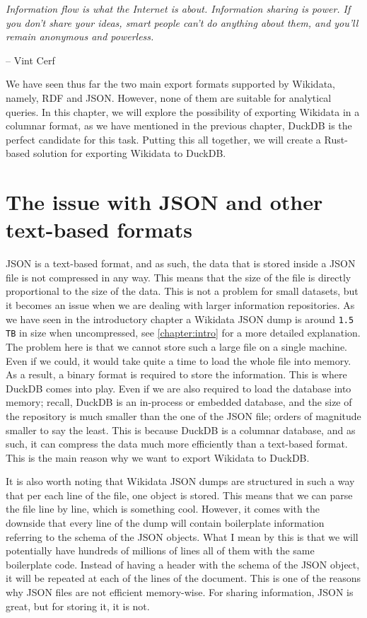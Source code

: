 \epigraph{\textit{Information flow is what the Internet is about. Information sharing is power. If you don't share your ideas, smart people can't do anything about them, and you'll remain anonymous and powerless.}}{-- \textup{Vint Cerf}}

We have seen thus far the two main export formats supported by Wikidata, namely, RDF and JSON. However, none of them are suitable for analytical queries. In this chapter, we will explore the possibility of exporting Wikidata in a columnar format, as we have mentioned in the previous chapter, DuckDB is the perfect candidate for this task. Putting this all together, we will create a Rust-based solution for exporting Wikidata to DuckDB.

\section{The issue with JSON and other text-based formats}
\label{section:issue}

JSON is a text-based format, and as such, the data that is stored inside a JSON file is not compressed in any way. This means that the size of the file is directly proportional to the size of the data. This is not a problem for small datasets, but it becomes an issue when we are dealing with larger information repositories. As we have seen in the introductory chapter a Wikidata JSON dump is around \texttt{1.5 TB} in size when uncompressed, see \ref{chapter:intro} for a more detailed explanation. The problem here is that we cannot store such a large file on a single machine. Even if we could, it would take quite a time to load the whole file into memory. As a result, a binary format is required to store the information. This is where DuckDB comes into play. Even if we are also required to load the database into memory; recall, DuckDB is an in-process or embedded database, and the size of the repository is much smaller than the one of the JSON file; orders of magnitude smaller to say the least. This is because DuckDB is a columnar database, and as such, it can compress the data much more efficiently than a text-based format. This is the main reason why we want to export Wikidata to DuckDB.

It is also worth noting that Wikidata JSON dumps are structured in such a way that per each line of the file, one object is stored. This means that we can parse the file line by line, which is something cool. However, it comes with the downside that every line of the dump will contain boilerplate information referring to the schema of the JSON objects. What I mean by this is that we will potentially have hundreds of millions of lines all of them with the same boilerplate code. Instead of having a header with the schema of the JSON object, it will be repeated at each of the lines of the document. This is one of the reasons why JSON files are not efficient memory-wise. For sharing information, JSON is great, but for storing it, it is not.

